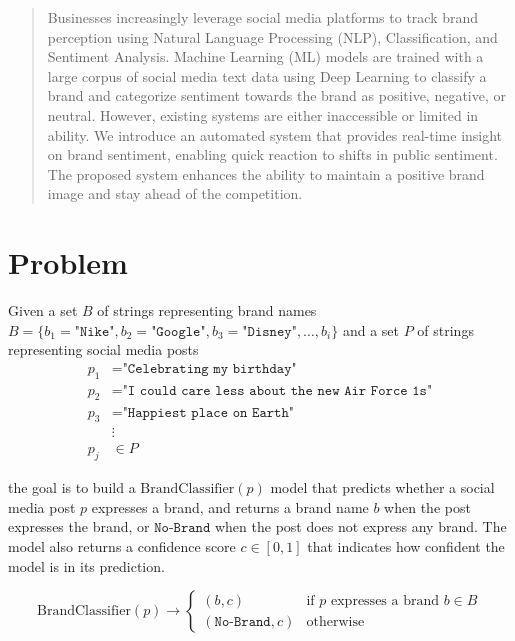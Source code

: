 \documentclass{article}
\begin{document}

\begin{abstract}

    \noindent Businesses increasingly leverage social media platforms to track
    brand perception using Natural Language Processing (NLP), Classification, and
    Sentiment Analysis. Machine Learning (ML) models are trained with a large
    corpus of social media text data using Deep Learning to classify a brand and
    categorize sentiment towards the brand as positive, negative, or neutral.
    However, existing systems are either inaccessible or limited in ability. We
    introduce an automated system that provides real-time insight on brand
    sentiment, enabling quick reaction to shifts in public sentiment. The proposed
    system enhances the ability to maintain a positive brand image and stay ahead
    of the competition.

\end{abstract}

\section*{Problem}

Given a set $B$ of strings representing brand names $B = \{b_1 =
    \texttt{"Nike"}, b_2 = \texttt{"Google"}, b_3 = \texttt{"Disney"}, \ldots,
    b_i\}$ and a set $P$ of strings representing social media posts
\begin{align*}
    p_1 & = \texttt{"Celebrating my birthday"}                      \\
    p_2 & = \texttt{"I could care less about the new Air Force 1s"} \\
    p_3 & = \texttt{"Happiest place on Earth"}                      \\
        & \vdots                                                    \\
    p_j & \in P
\end{align*}

the goal is to build a $\mathrm{BrandClassifier}(p)$ model that predicts
whether a
social media post $p$ expresses a brand, and returns a brand name $b$ when the
post expresses the brand, or $\texttt{No-Brand}$ when the post does not express
any brand. The model also returns a confidence score $c \in [0, 1]$ that
indicates how confident the model is in its prediction.

\[
    \mathrm{BrandClassifier}(p) \rightarrow \begin{cases}
        (b, c)                 & \text{if } p \text{ expresses a brand } b \in
        B
        \\
        (\texttt{No-Brand}, c) & \text{otherwise}
    \end{cases}
\]
\end{document}
